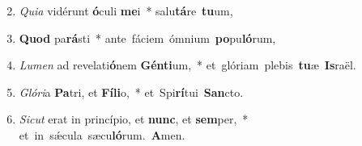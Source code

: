 \begin{flushleft}
\begin{enumerate}[leftmargin=*]
\setcounter{enumi}{1}
\item \textit{Quia} vidérunt \textbf{ó}culi \textbf{me}i~* \mbox{salu\textbf{tá}re \textbf{tu}um,}
\item \textbf{Quod} pa\textbf{rá}sti~* \mbox{ante fáciem ómnium \textbf{po}pu\textbf{ló}rum,}
\item \textit{Lumen} ad revelati\textbf{ó}nem \textbf{Gén}\textbf{ti}um,~* \mbox{et glóriam plebis \textbf{tu}æ \textbf{Is}raël.}
\item \textit{Glóri}a \textbf{Pa}tri, et \textbf{Fí}\textbf{li}o,~* \mbox{et Spi\textbf{rí}tui \textbf{San}cto.}
\item \textit{Sicut} erat in princípio, et \textbf{nunc}, et \textbf{sem}per,~* \mbox{et in s\'{\ae}cula sæcu\textbf{ló}rum. \textbf{A}men.}
\end{enumerate}
\end{flushleft}
